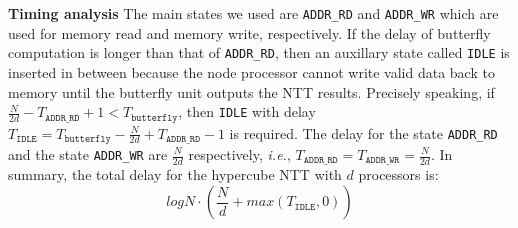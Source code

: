 \documentclass{iacrtrans}
\theoremstyle{plain}
\begin{document}
 \begin{table}[!t]\centering
 \caption{Performance of the configurable hypercube NTT hardware for FHEW-like FHE schemes on Xilinx Artix-7 FPGA}
 \label{table:hypercube-ntt-result}
 \begin{minipage}{\textwidth}\centering
 \end{minipage}
 \vspace{0mm}
 \end{table}


\textbf{Timing analysis} The main states we used are \texttt{ADDR\_RD} and \texttt{ADDR\_WR} which are used for memory read and memory write, respectively. If the delay of butterfly computation is longer than that of \texttt{ADDR\_RD}, then an auxillary state called \texttt{IDLE} is inserted in between because the node processor cannot write valid data back to memory until the butterfly unit outputs the NTT results. Precisely speaking, if $\frac{N}{2d}-T_{\texttt{ADDR\_RD}}+1<T_{\texttt{butterfly}}$, then \texttt{IDLE} with delay $T_{\texttt{IDLE}}=T_{\texttt{butterfly}}-\frac{N}{2d}+T_{\texttt{ADDR\_RD}}-1$ is required. The delay for the state \texttt{ADDR\_RD} and the state \texttt{ADDR\_WR} are $\frac{N}{2d}$ respectively, \textit{i.e.}, $T_{\texttt{ADDR\_RD}} = T_{\texttt{ADDR\_WR}}= \frac{N}{2d}$. In summary, the total delay for the hypercube NTT with $d$ processors is:
\[
    logN\cdot\left(\frac{N}{d}+max(T_{\texttt{IDLE}},0)\right )
\]
\end{document}
